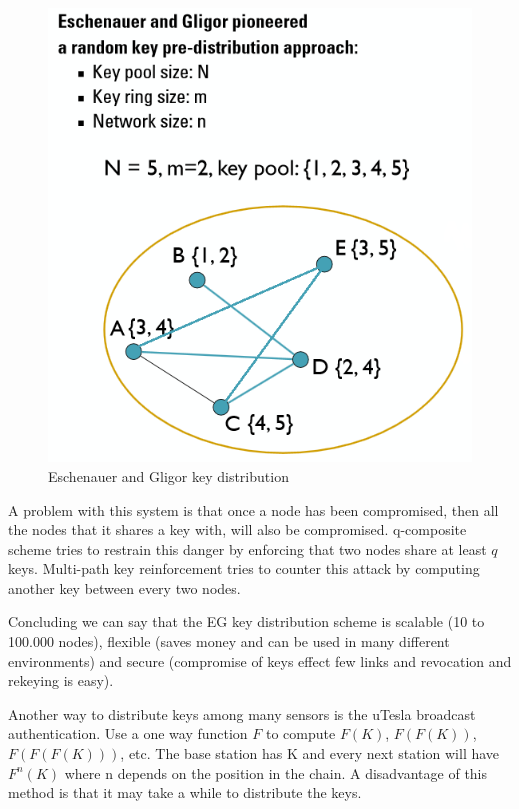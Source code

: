 \documentclass{article}
\begin{document}
\begin{figure}[!h]
\centering
\includegraphics[width=\textwidth, height=\textheight, keepaspectratio]{images/eg_keydistribution.png}
\caption{Eschenauer and Gligor key distribution}
\label{fig:egkeydistribution}
\end{figure}

A problem with this system is that once a node has been compromised, then all the nodes that it shares a key with, will also be compromised. q-composite scheme tries to restrain this danger by enforcing that two nodes share at least $q$ keys. Multi-path key reinforcement tries to counter this attack by computing another key between every two nodes.

Concluding we can say that the EG key distribution scheme is scalable (10 to 100.000 nodes), flexible (saves money and can be used in many different environments) and secure (compromise of keys effect few links and revocation and rekeying is easy).

Another way to distribute keys among many sensors is the uTesla broadcast authentication. Use a one way function $F$ to compute $F(K)$, $F(F(K))$, $F(F(F(K)))$, etc. The base station has K and every next station will have $F^{n}(K)$ where n depends on the position in the chain. A disadvantage of this method is that it may take a while to distribute the keys.
\end{document}
